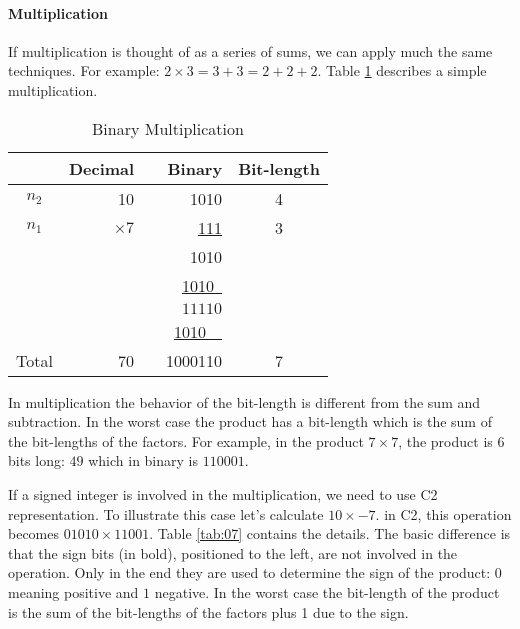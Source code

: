 \documentclass[12pt]{article}
\begin{document}
\paragraph{Multiplication}
If multiplication is thought of as a series of sums, we can apply much the same
techniques. For example: $2 \times 3 = 3 + 3 = 2 + 2 + 2$. Table \ref{tab:06}
describes a simple multiplication.

\begin{table}[ht]
	\centering
    \caption{Binary Multiplication}
    \begin{tabular}{crrrc}
    \hline
    	  & Decimal & & Binary & Bit-length \\
    \hline      
    $n_2$ & 10	& & 1010 & 4\\
    $n_1$ & \underline{$\times 7$} & & \underline{111} & 3 \\
    & & & 1010  & \\
    & & & \underline{1010\ } & \\
    & & & $11110$ & \\
    & & & \underline{1010\ \ } & \\
    Total& 70 & & 1000110 & 7\\
    \hline
	\end{tabular}
    \label{tab:06}
\end{table}

In multiplication the behavior of the bit-length is different from the sum and
subtraction. In the worst case the product has a bit-length which is the sum of
the bit-lengths of the factors. For example, in the product $7\times7$, the
product is 6 bits long: $49$ which in binary is $110001$.

If a signed integer is involved in the multiplication, we need to use C2
representation. To illustrate this case let's calculate $10\times-7$. in C2,
this operation becomes $01010\times11001$. Table \ref{tab:07} contains the
details. The basic difference is that the sign bits (in bold), positioned to
the left, are not involved in the operation. Only in the end they are used to
determine the sign of the product: $0$ meaning positive and $1$ negative. In
the worst case the bit-length of the product is the sum of the bit-lengths of
the factors plus 1 due to the sign.
\end{document}

